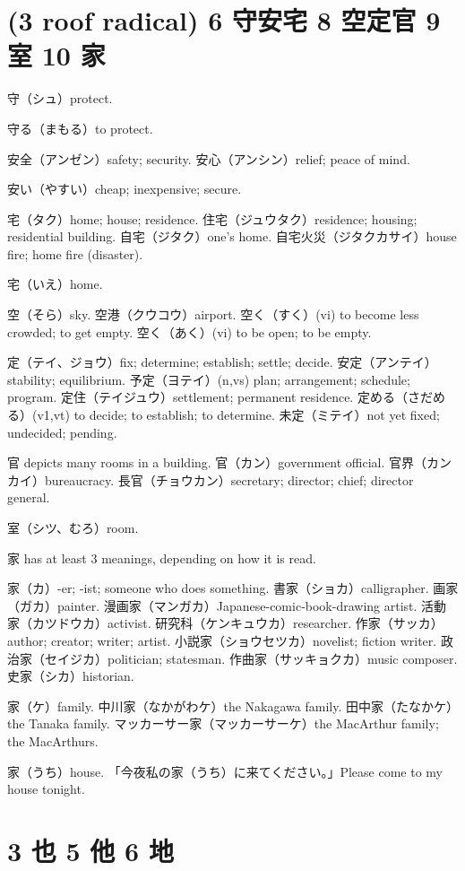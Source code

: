 \section{(3 roof radical) 6 守安宅 8 空定官 9 室 10 家}

守（シュ）protect.

守る（まもる）to protect.

安全（アンゼン）safety; security.
安心（アンシン）relief; peace of mind.

安い（やすい）cheap; inexpensive; secure.

宅（タク）home; house; residence.
住宅（ジュウタク）residence; housing; residential building.
自宅（ジタク）one's home.
自宅火災（ジタクカサイ）house fire; home fire (disaster).

宅（いえ）home.

空（そら）sky.
空港（クウコウ）airport.
空く（すく）(vi) to become less crowded; to get empty.
空く（あく）(vi) to be open; to be empty.

定（テイ、ジョウ）fix; determine; establish; settle; decide.
安定（アンテイ）stability; equilibrium.
予定（ヨテイ）(n,vs) plan; arrangement; schedule; program.
定住（テイジュウ）settlement; permanent residence.
定める（さだめる）(v1,vt) to decide; to establish; to determine.
未定（ミテイ）not yet fixed; undecided; pending.

官 depicts many rooms in a building.
官（カン）government official.
官界（カンカイ）bureaucracy.
長官（チョウカン）secretary; director; chief; director general.

室（シツ、むろ）room.

家 has at least 3 meanings, depending on how it is read.

家（カ）-er; -ist; someone who does something.
書家（ショカ）calligrapher.
画家（ガカ）painter.
漫画家（マンガカ）Japanese-comic-book-drawing artist.
活動家（カツドウカ）activist.
研究科（ケンキュウカ）researcher.
作家（サッカ）author; creator; writer; artist.
小説家（ショウセツカ）novelist; fiction writer.
政治家（セイジカ）politician; statesman.
作曲家（サッキョクカ）music composer.
史家（シカ）historian.

家（ケ）family.
中川家（なかがわケ）the Nakagawa family.
田中家（たなかケ）the Tanaka family.
マッカーサー家（マッカーサーケ）the MacArthur family; the MacArthurs.

家（うち）house.
「今夜私の家（うち）に来てください。」Please come to my house tonight.

\section{3 也 5 他 6 地}

